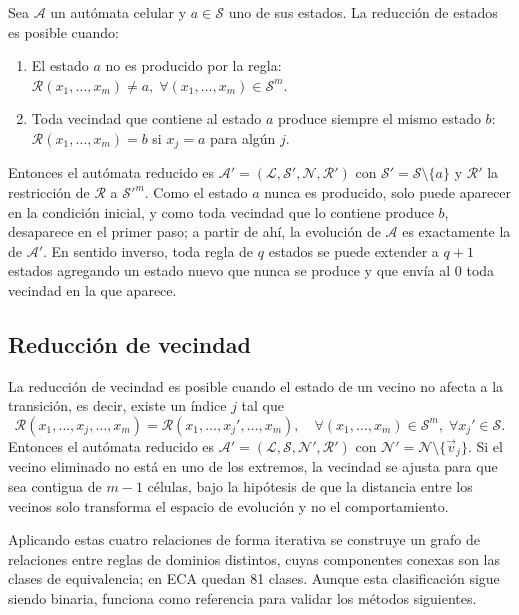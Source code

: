 Sea $\mathcal{A}$ un autómata celular y $a \in \mathcal{S}$ uno de sus estados. La reducción de estados es posible cuando:
\begin{enumerate}
    \item El estado $a$ no es producido por la regla: $\mathcal{R}(x_1, \dots, x_m) \neq a, \; \forall (x_1, \dots, x_m) \in \mathcal{S}^m$.
    \item Toda vecindad que contiene al estado $a$ produce siempre el mismo estado $b$: $\mathcal{R}(x_1, \dots, x_m) = b$ si $x_j = a$ para algún $j$.
\end{enumerate}
Entonces el autómata reducido es $\mathcal{A}' = (\mathcal{L}, \mathcal{S}', \mathcal{N}, \mathcal{R}')$ con $\mathcal{S}' = \mathcal{S} \setminus \{a\}$ y $\mathcal{R}'$ la restricción de $\mathcal{R}$ a $\mathcal{S}'^m$. Como el estado $a$ nunca es producido, solo puede aparecer en la condición inicial, y como toda vecindad que lo contiene produce $b$, desaparece en el primer paso; a partir de ahí, la evolución de $\mathcal{A}$ es exactamente la de $\mathcal{A}'$. En sentido inverso, toda regla de $q$ estados se puede extender a $q + 1$ estados agregando un estado nuevo que nunca se produce y que envía al 0 toda vecindad en la que aparece.

\subsection{Reducción de vecindad}

La reducción de vecindad es posible cuando el estado de un vecino no afecta a la transición, es decir, existe un índice $j$ tal que
\[
\mathcal{R}(x_1, \dots, x_j, \dots, x_m) = \mathcal{R}(x_1, \dots, x_j', \dots, x_m), \quad \forall (x_1, \dots, x_m) \in \mathcal{S}^m, \; \forall x_j' \in \mathcal{S}.
\]
Entonces el autómata reducido es $\mathcal{A}' = (\mathcal{L}, \mathcal{S}, \mathcal{N}', \mathcal{R}')$ con $\mathcal{N}' = \mathcal{N} \setminus \{\vec{v}_j\}$. Si el vecino eliminado no está en uno de los extremos, la vecindad se ajusta para que sea contigua de $m - 1$ células, bajo la hipótesis de que la distancia entre los vecinos solo transforma el espacio de evolución y no el comportamiento.

Aplicando estas cuatro relaciones de forma iterativa se construye un grafo de relaciones entre reglas de dominios distintos, cuyas componentes conexas son las clases de equivalencia; en ECA quedan 81 clases. Aunque esta clasificación sigue siendo binaria, funciona como referencia para validar los métodos siguientes.
